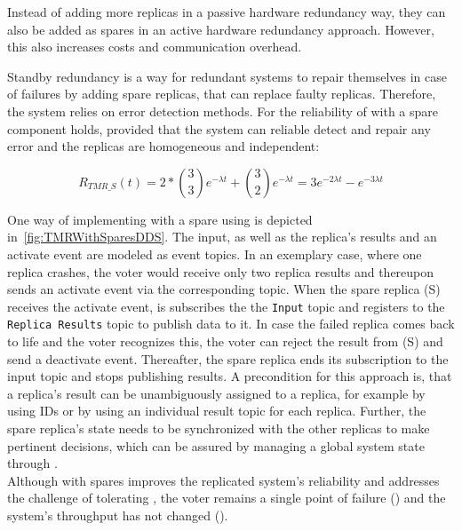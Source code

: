 Instead of adding more replicas in a passive hardware redundancy way, they can also be added as spares in an active hardware redundancy approach.
However, this also increases costs and communication overhead.

Standby redundancy is a way for redundant systems to repair themselves in case of failures by adding spare replicas, that can replace faulty replicas.
Therefore, the system relies on error detection methods.
For the reliability of  with a spare component holds, provided that the system can reliable detect and repair any error and the replicas are homogeneous and independent:

\begin{equation}
R_{TMR\_S}(t) = 2 * {3 \choose 3} e^{-\lambda t} + {3 \choose 2} e^{-\lambda t}
 = 3e^{-2 \lambda t} - e^{-3 \lambda t}
\end{equation}

One way of implementing  with a spare using  is depicted in~\autoref{fig:TMRWithSparesDDS}.
The input, as well as the replica's results and an activate event are modeled as  event topics.
In an exemplary case, where one replica crashes, the voter would receive only two replica results and thereupon sends an activate event via the corresponding topic.
When the spare replica (S) receives the activate event, is subscribes the the \texttt{Input} topic and registers to the \texttt{Replica Results} topic to publish data to it.
In case the failed replica comes back to life and the voter recognizes this, the voter can reject the result from (S) and send a deactivate event.
Thereafter, the spare replica ends its subscription to the input topic and stops publishing results.
A precondition for this approach is, that a replica's result can be unambiguously assigned to a replica, for example by using IDs or by using an individual result topic for each replica.
Further, the spare replica's state needs to be synchronized with the other replicas to make pertinent decisions, which can be assured by managing a global system state through .
\\

Although  with spares improves the replicated system's reliability and addresses the challenge of tolerating \ChallengeWR, the voter remains a single point of failure (\ChallengeVoter) and the system's throughput has not changed (\ChallengeThrough).

